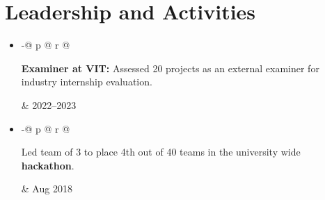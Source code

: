 \documentclass[letterpaper,11pt, ]{article}
\makeatletter
\newcommand{\extracurricularItem}[2]{%
  \vspace{-2pt}%
  \item[\textbullet]%
  \begin{tabular*}{\dimexpr\textwidth-\leftmargin}{@{} p{\dimexpr\textwidth-6\leftmargin-2\tabcolsep} @{\extracolsep{\fill}} r @{}}%
      \begin{minipage}[t]{\linewidth}%
        #1%
      \end{minipage} & \small #2 \\
  \end{tabular*}%
  \vspace{-20pt}%
}
\newcommand{\extracurricularItemListStart}{\begin{itemize}[leftmargin=*, itemsep=4pt, parsep=4pt]}
\newcommand{\extracurricularItemListEnd}{\end{itemize}\vspace{-5pt}}
\makeatother
\begin{document}
\vspace{-15pt}

\section{Leadership and Activities}
    \extracurricularItemListStart
      \extracurricularItem{\textbf{Examiner at VIT:} Assessed 20 projects as an external examiner for industry internship evaluation.}{2022--2023}
      \extracurricularItem{Led team of 3 to place 4th out of 40 teams in the university wide \textbf{hackathon}.}{Aug 2018}
    \extracurricularItemListEnd
\end{document}
